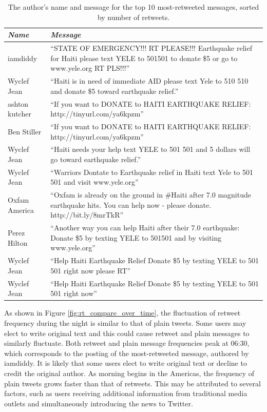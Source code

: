 \documentclass[a4paper, 11pt, titlepage]{article}
\begin{document}
\begin{center}
  \begin{table}[!ht]
  \begin{tabular}{| l | p{9.5cm} |}
    \hline
    \textit{Name} & \textit{Message} \\
    \hline
    iamdiddy & ``STATE OF EMERGENCY!!! RT PLEASE!!! Earthquake relief for Haiti please text YELE to 501501 to donate \$5 or go to www.yele.org RT PLS!!!'' \\
    \hline
    Wyclef Jean & ``Haiti is in need of immediate AID please text Yele to 510 510 and donate \$5 toward earthquake relief.'' \\
    \hline
    ashton kutcher & ``If you want to DONATE to HAITI EARTHQUAKE RELIEF: http://tinyurl.com/ya6kpzm'' \\
    \hline
    Ben Stiller & ``If you want to DONATE to HAITI EARTHQUAKE RELIEF: http://tinyurl.com/ya6kpzm'' \\
    \hline
    Wyclef Jean & ``Haiti needs your help text YELE to 501 501 and 5 dollars will go toward earthquake relief.'' \\
    \hline
    Wyclef Jean & ``Warriors Dontate to Earthquake relief in Haiti text Yele to  501 501 and visit www.yele.org'' \\
    \hline
    Oxfam America & ``Oxfam is already on the ground in \#Haiti after 7.0 magnitude earthquake hits. You can help now - please donate. http://bit.ly/8mrTkR'' \\
    \hline
    Perez Hilton & ``Another way you can help Haiti after their 7.0 earthquake: Donate \$5 by texting YELE to 501501 and by visiting www.yele.org'' \\
    \hline
    Wyclef Jean & ``Help Haiti Earthquake Relief Donate \$5 by texting YELE to 501 501 right now please RT'' \\
    \hline
    Wyclef Jean & ``Help Haiti Earthquake Relief Donate \$5 by texting YELE to 501 501 right now'' \\
    \hline
  \end{tabular}
  \label{ref:top_retweets_table}
  \caption{The author's name and message for the top 10 most-retweeted messages, sorted by number of retweets.}
  \end{table}
\end{center}

As shown in Figure \ref{fig:rt_compare_over_time}, the fluctuation of retweet frequency during the night is similar to that of plain tweets.  Some users may elect to write original text and this could cause retweet and plain messages to similarly fluctuate.  Both retweet and plain message frequencies peak at 06:30, which corresponds to the posting of the most-retweeted message, authored by iamdiddy.  It is likely that some users elect to write original text or decline to credit the original author.  As morning begins in the Americas, the frequency of plain tweets grows faster than that of retweets.  This may be attributed to several factors, such as users receiving additional information from traditional media outlets and simultaneously introducing the news to Twitter.  
\end{document}

